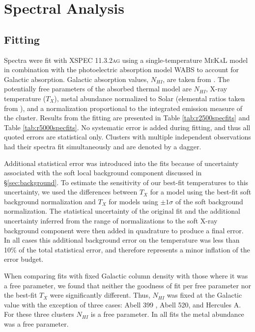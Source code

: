 \documentclass[12pt,preprint]{aastex}
\begin{document}
\section{Spectral Analysis} \label{sec:specan}

\subsection{Fitting} \label{sec:fitting}

Spectra were fit with {\textsc{XSPEC 11.3.2ag}} \citep{1996ASPC..101...17A}
using a single-temperature {\textsc{MeKaL}} model in combination with the
photoelectric absorption model {\textsc{WABS}} \citep{1983ApJ...270..119M}
to account for Galactic absorption. Galactic absorption values,
$N_{HI}$, are taken from \cite{1990ARA&A..28..215D}. The potentially
free parameters of the absorbed thermal model are
$N_{HI}$, X-ray temperature ($T_{X}$), metal abundance normalized to Solar
(elemental ratios taken from \cite{1989GeCoA..53..197A}), and a
normalization proportional to the integrated emission measure of the
cluster. Results from the fitting are presented in Table
\ref{tab:r2500specfits} and Table \ref{tab:r5000specfits}. No
systematic error is added during fitting, and thus all quoted errors
are statistical only. Clusters with multiple independent observations
had their spectra fit simultaneously and are denoted by a dagger.

Additional statistical error was introduced into the fits because of
uncertainty associated with the soft local background component
discussed in \S\ref{sec:background}. To estimate the sensitivity of
our best-fit temperatures to this uncertainty, we used the differences
between $T_{X}$ for a model using the best-fit soft background
normalization and $T_{X}$ for models using $\pm1\sigma$ of the soft
background normalization. The statistical uncertainty of the original
fit and the additional uncertainty inferred from the range of
normalizations to the soft X-ray background component were then added
in quadrature to produce a final error. In all cases this additional
background error on the temperature was less than 10\% of the total
statistical error, and therefore represents a minor inflation of the
error budget.

When comparing fits with fixed Galactic column density with those
where it was a free parameter, we found that neither the goodness of
fit per free parameter nor the best-fit $T_{X}$ were significantly
different. Thus, $N_{HI}$ was fixed at the Galactic value with the
exception of three cases: Abell 399 \citep{2004MNRAS.351.1439S}, Abell
520, and Hercules A. For these three clusters $N_{HI}$ is a free
parameter. In all fits the metal abundance was a free parameter.
\end{document}
